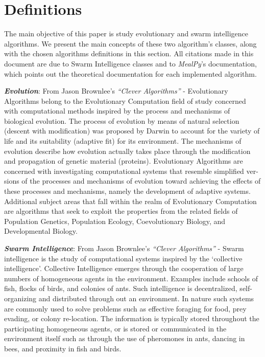 \documentclass[conference]{IEEEtran}
\begin{document}
\section{Definitions}
\label{sec:definitions}

The main objective of this paper is study evolutionary and swarm intelligence algorithms.
We present the main concepts of these two algorithm's classes, along with the chosen algorithms
definitions in this section. All citations made in this document are due to Swarm Intelligence classes
and to \textit{MealPy}'s documentation, which points out the theoretical documentation for each
implemented algorithm.

\textit{\textbf{Evolution}}: From Jason Brownlee's \textit{``Clever Algorithms''} -
Evolutionary Algorithms belong to the Evolutionary Computation
field of study concerned with computational methods inspired by the process
and mechanisms of biological evolution. The process of evolution by
means of natural selection (descent with modification) was proposed by
Darwin to account for the variety of life and its suitability (adaptive
fit) for its environment. The mechanisms of evolution describe how
evolution actually takes place through the modification and propagation
of genetic material (proteins). Evolutionary Algorithms are concerned
with investigating computational systems that resemble simplified ver-
sions of the processes and mechanisms of evolution toward achieving
the effects of these processes and mechanisms, namely the development
of adaptive systems. Additional subject areas that fall within the realm
of Evolutionary Computation are algorithms that seek to exploit the
properties from the related fields of Population Genetics, Population
Ecology, Coevolutionary Biology, and Developmental Biology.

\textit{\textbf{Swarm Intelligence}}: From Jason Brownlee's \textit{``Clever Algorithms''} -
Swarm intelligence is the study of computational systems inspired by
the ‘collective intelligence’. Collective Intelligence emerges through the
cooperation of large numbers of homogeneous agents in the environment.
Examples include schools of fish, flocks of birds, and colonies of ants.
Such intelligence is decentralized, self-organizing and distributed through
out an environment. In nature such systems are commonly used to
solve problems such as effective foraging for food, prey evading, or
colony re-location. The information is typically stored throughout the
participating homogeneous agents, or is stored or communicated in
the environment itself such as through the use of pheromones in ants,
dancing in bees, and proximity in fish and birds.
\end{document}
